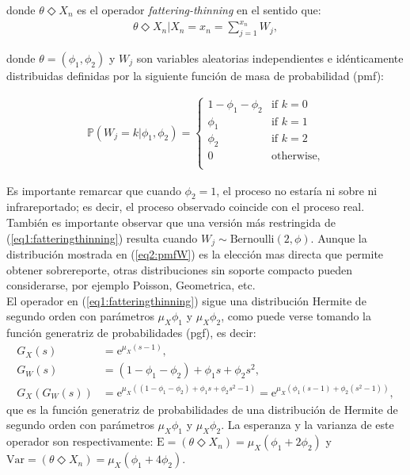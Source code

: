 \documentclass[12pt,twoside]{article} %
\begin{document}
\noindent donde $\theta \Diamond X_n$ es el operador \textit{fattering-thinning} en el sentido que:
\begin{align}\label{eq1:fatteringthinning}
\theta \Diamond X_n|X_n=x_n=\sum_{j=1}^{x_n}W_j,
\end{align}

\noindent donde $\theta=(\phi_1,\phi_2)$ y $W_j$ son variables aleatorias independientes e idénticamente distribuidas definidas por la siguiente función de masa de probabilidad (pmf):

\begin{align}\label{eq2:pmfW}
\mathbb{P}(W_j=k|\phi_1,\phi_2)=\begin{cases} 
1-\phi_1-\phi_2 & \textrm{if } k=0  \\
\phi_1 & \textrm{if } k=1  \\
\phi_2 & \textrm{if } k=2  \\
0 & \textrm{otherwise}, \\
\end{cases}
\end{align}

\noindent Es importante remarcar que cuando $\phi_2=1$, el proceso no estaría ni sobre ni infrareportado; es decir, el proceso observado coincide con el proceso real. También es importante observar que una versión más restringida de (\ref{eq1:fatteringthinning}) resulta cuando $W_j \sim \textrm{Bernoulli}(2,\phi)$. Aunque la distribución mostrada en (\ref{eq2:pmfW}) es la elección mas directa que permite obtener sobrereporte, otras distribuciones sin soporte compacto pueden considerarse, por ejemplo Poisson, Geometrica, etc. \\
El operador en (\ref{eq1:fatteringthinning}) sigue una distribución Hermite de segundo orden con parámetros $\mu_X\phi_1$ y $\mu_X\phi_2$, como puede verse tomando la función generatriz de probabilidades (pgf), es decir:
\begin{align}
G_X(s)&=\textrm{e}^{\mu_X(s-1)}, \label{eq3:pgfpox}\\
G_W(s)&=(1-\phi_1-\phi_2)+\phi_1s+\phi_2s^2, \label{eq3:pgfw}\\
G_X\left(G_W(s)\right)&=\textrm{e}^{\mu_X\left((1-\phi_1-\phi_2)+\phi_1s+\phi_2s^2-1\right)}=\textrm{e}^{\mu_X\left(\phi_1(s-1)+\phi_2(s^2-1)\right)} \label{eq3:pgffath} ,
\end{align}
que es la función generatriz de probabilidades de una distribución de Hermite de segundo orden con parámetros $\mu_X\phi_1$ y $\mu_X\phi_2$. La esperanza y la varianza de este operador son respectivamente: $\textrm{E}=\left(\theta \Diamond X_n\right)=\mu_X\left(\phi_1+2\phi_2\right)$ y $\textrm{Var}=\left(\theta \Diamond X_n\right)=\mu_X\left(\phi_1+4\phi_2\right)$.
\end{document}
